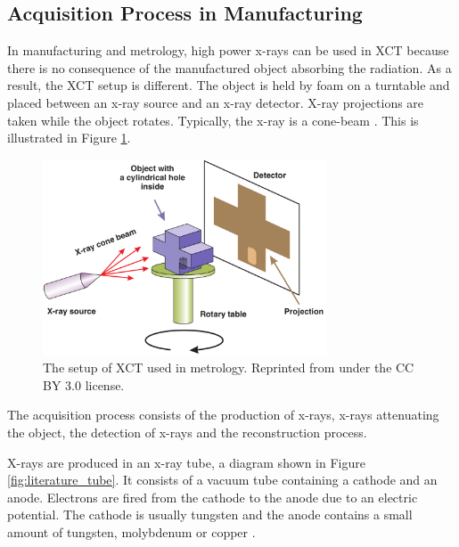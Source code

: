 \subsection{Acquisition Process in Manufacturing}

In manufacturing and metrology, high power x-rays can be used in XCT because there is no consequence of the manufactured object absorbing the radiation. As a result, the XCT setup is different. The object is held by foam on a turntable and placed between an x-ray source and an x-ray detector. X-ray projections are taken while the object rotates. Typically, the x-ray is a cone-beam \citep{kruth2011computed}. This is illustrated in Figure \ref{fig:literature_xct}.

\begin{figure}
  \centering
  \includegraphics[width=0.75\textwidth]{../figures/literatureReview/literature_xct.png}
  \caption{The setup of XCT used in metrology. Reprinted from \cite{warnett2016towards} under the CC BY 3.0 license.}
  \label{fig:literature_xct}
\end{figure}

The acquisition process consists of the production of x-rays, x-rays attenuating the object, the detection of x-rays and the reconstruction process.

X-rays \citep{rontgen1896on} are produced in an x-ray tube, a diagram shown in Figure \ref{fig:literature_tube}. It consists of a vacuum tube containing a cathode and an anode. Electrons are fired from the cathode to the anode due to an electric potential. The cathode is usually tungsten and the anode contains a small amount of tungsten, molybdenum or copper \citep{sun2012overview}.

